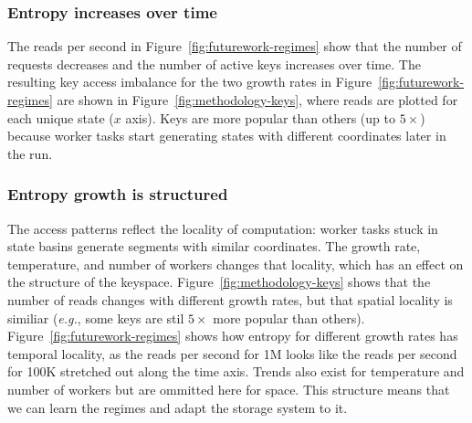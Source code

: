 \subsubsection*{Entropy increases over time} The reads per second in
Figure~\ref{fig:futurework-regimes} show that the number of requests decreases
and the number of active keys increases over time. The resulting key access
imbalance for the two growth rates in Figure~\ref{fig:futurework-regimes} are
shown in Figure~\ref{fig:methodology-keys}, where reads are plotted for each
unique state (\(x\) axis). Keys are more popular than others (up to
\(5\times\)) because worker tasks start generating states with different
coordinates later in the run.

\subsubsection*{Entropy growth is structured} The access patterns reflect the
locality of computation: worker tasks stuck in state basins generate segments with
similar coordinates. The growth rate, temperature, and number of workers
changes that locality, which has an effect on the structure of the keyspace.
Figure~\ref{fig:methodology-keys} shows that the number of reads changes with
different growth rates, but that spatial locality is similiar ({\it e.g.}, some
keys are stil \(5\times\) more popular than others).
Figure~\ref{fig:futurework-regimes} shows how entropy for different growth
rates has temporal locality, as the reads per second for 1M looks like the
reads per second for 100K stretched out along the time axis.  Trends also exist
for temperature and number of workers but are ommitted here for space. This
structure means that we can learn the regimes and adapt the storage system to
it. 
